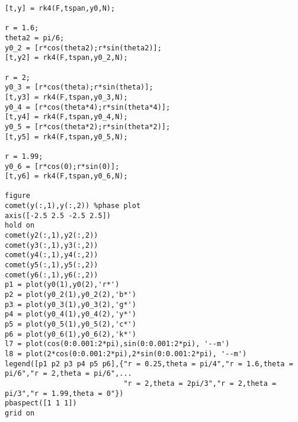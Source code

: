 \begin{questions}
\begin{verbatim}
[t,y] = rk4(F,tspan,y0,N);

r = 1.6;
theta2 = pi/6;
y0_2 = [r*cos(theta2);r*sin(theta2)];
[t,y2] = rk4(F,tspan,y0_2,N);

r = 2;
y0_3 = [r*cos(theta);r*sin(theta)];
[t,y3] = rk4(F,tspan,y0_3,N);
y0_4 = [r*cos(theta*4);r*sin(theta*4)];
[t,y4] = rk4(F,tspan,y0_4,N);
y0_5 = [r*cos(theta*2);r*sin(theta*2)];
[t,y5] = rk4(F,tspan,y0_5,N);

r = 1.99;
y0_6 = [r*cos(0);r*sin(0)];
[t,y6] = rk4(F,tspan,y0_6,N);

figure
comet(y(:,1),y(:,2)) %phase plot
axis([-2.5 2.5 -2.5 2.5])
hold on
comet(y2(:,1),y2(:,2))
comet(y3(:,1),y3(:,2))
comet(y4(:,1),y4(:,2))
comet(y5(:,1),y5(:,2))
comet(y6(:,1),y6(:,2))
p1 = plot(y0(1),y0(2),'r*')
p2 = plot(y0_2(1),y0_2(2),'b*')
p3 = plot(y0_3(1),y0_3(2),'g*')
p4 = plot(y0_4(1),y0_4(2),'y*')
p5 = plot(y0_5(1),y0_5(2),'c*')
p6 = plot(y0_6(1),y0_6(2),'k*')
l7 = plot(cos(0:0.001:2*pi),sin(0:0.001:2*pi), '--m')
l8 = plot(2*cos(0:0.001:2*pi),2*sin(0:0.001:2*pi), '--m')
legend([p1 p2 p3 p4 p5 p6],{"r = 0.25,theta = pi/4","r = 1.6,theta = pi/6","r = 2,theta = pi/6",...
                            "r = 2,theta = 2pi/3","r = 2,theta = pi/3","r = 1.99,theta = 0"})
pbaspect([1 1 1])
grid on
\end{verbatim}

\end{questions}